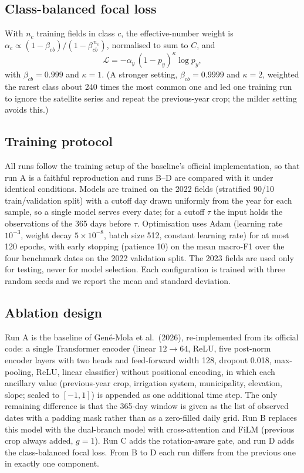 \subsection{Class-balanced focal loss}
With $n_c$ training fields in class $c$, the effective-number weight is
$\alpha_c \propto (1 - \beta_{cb}) / (1 - \beta_{cb}^{\,n_c})$, normalised to sum to $C$, and
\begin{equation}
  \mathcal{L} = - \alpha_{y}\,(1 - p_{y})^{\kappa} \log p_{y},
\end{equation}
with $\beta_{cb} = 0.999$ and $\kappa = 1$. (A stronger setting, $\beta_{cb} = 0.9999$ and $\kappa = 2$, weighted the
rarest class about 240 times the most common one and led one training run to ignore the satellite series and
repeat the previous-year crop; the milder setting avoids this.)

\subsection{Training protocol}
All runs follow the training setup of the baseline's official implementation, so that run A is a faithful
reproduction and runs B--D are compared with it under identical conditions. Models are trained on the 2022
fields (stratified 90/10 train/validation split) with a cutoff day drawn uniformly from the year for each sample,
so a single model serves every date; for a cutoff $\tau$ the input holds the observations of the 365 days before
$\tau$. Optimisation uses Adam (learning rate $10^{-3}$, weight decay $5\times10^{-8}$, batch size 512, constant
learning rate) for at most 120 epochs, with early stopping (patience 10) on the mean macro-F1 over the four
benchmark dates on the 2022 validation split. The 2023 fields are used only for testing, never for model
selection. Each configuration is trained with three random seeds and we report the mean and standard deviation.

\subsection{Ablation design}
Run A is the baseline of Gen\'e-Mola et al.\ (2026), re-implemented from its official code: a single Transformer
encoder (linear $12\to64$, ReLU, five post-norm encoder layers with two heads and feed-forward width 128,
dropout 0.018, max-pooling, ReLU, linear classifier) without positional encoding, in which each ancillary value
(previous-year crop, irrigation system, municipality, elevation, slope; scaled to $[-1,1]$) is appended as one
additional time step. The only remaining difference is that the 365-day window is given as the list of observed
dates with a padding mask rather than as a zero-filled daily grid. Run B replaces this model with the dual-branch
model with cross-attention and FiLM (previous crop always added, $g = 1$). Run C adds the rotation-aware gate,
and run D adds the class-balanced focal loss. From B to D each run differs from the previous one in exactly one
component.
